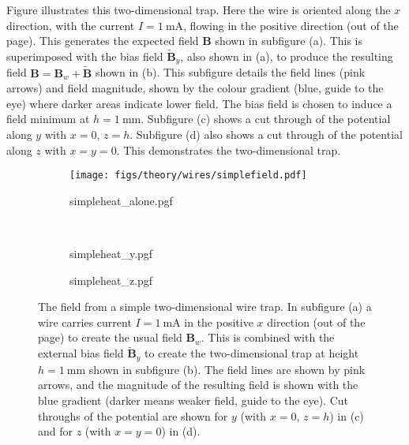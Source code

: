 Figure  illustrates this two-dimensional trap.
Here the wire is oriented along the $x$ direction, with the current
$I=\SI{1}{\milli\ampere}$, flowing in the
positive direction (out of the page). This generates the expected field
$\mathbf{B}$ shown in subfigure (a). This is superimposed with the bias field
$\mathbf{\tilde{B}}_y$, also shown in (a), to produce the resulting field
$\mathbf{B} = \mathbf{B}_w + \mathbf{\tilde{B}}$ shown
in (b). This subfigure details the field lines (pink arrows) and field
magnitude, shown by the colour gradient
(blue, guide to the eye) where darker areas indicate lower field. The bias field
is chosen to induce a field minimum at $h=\SI{1}{\milli\meter}$. Subfigure (c)
shows a cut through of the potential along $y$ with $x=0$, $z=h$. Subfigure (d)
also shows a cut through of the potential along $z$ with $x=y=0$. This
demonstrates the two-dimensional trap.

\begin{figure}[htbp]
  \centering
  \begin{subfigure}[b]{0.45\textwidth}
    \centering
    \hfill{}
    \texttt{[image: figs/theory/wires/simplefield.pdf]}
    \hfill{}
  \end{subfigure}
  \begin{subfigure}[b]{0.45\textwidth}
    \centering
    {simpleheat_alone.pgf}
  \end{subfigure} \\
  \begin{subfigure}[b]{0.45\textwidth}
    \centering
    {simpleheat_y.pgf}
  \end{subfigure}
  \begin{subfigure}[b]{0.45\textwidth}
    \centering
    {simpleheat_z.pgf}
  \end{subfigure}
  \caption[Two-dimensional wire trap]{
    The field from a simple two-dimensional wire trap. In subfigure (a) a wire carries
    current $I=\SI{1}{\milli\ampere}$ in the positive $x$ direction (out of the
    page) to create the usual field $\mathbf{B}_w$. This is combined with the
    external bias field $\mathbf{\tilde{B}}_y$ to create the two-dimensional trap
    at height $h=\SI{1}{\milli\meter}$
    shown in subfigure (b). The field lines are shown by pink arrows, and the
    magnitude of the resulting field is shown with the blue gradient (darker
    means weaker field, guide to the eye). Cut throughs of the potential are
    shown for $y$ (with $x=0$, $z=h$) in (c) and for $z$ (with $x = y = 0$) in
    (d).
  }
  \label{theory:fig:simplefield}
\end{figure}

